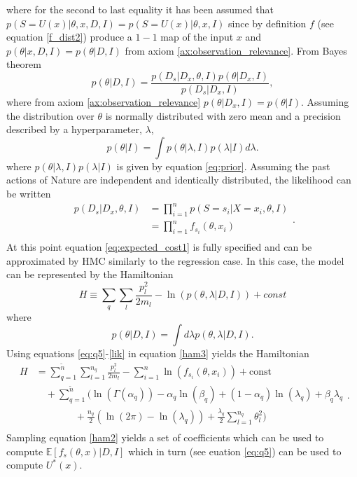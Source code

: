 	where for the second to last equality it has been assumed that $p(S = U(x)|\theta,x,D,I) = p(S = U(x)|\theta,x,I)$ since by definition $f$ (see equation \eqref{f_dist2}) produce a $1-1$ map of the input $x$ and $p(\theta|x,D,I) = p(\theta|D,I)$ from axiom \ref{ax:observation_relevance}. From Bayes theorem
	\begin{equation}
		p(\theta|D,I) =\frac{p(D_s|D_x,\theta,I)p(\theta|D_x,I)}{p(D_s|D_x,I)},
	\end{equation}
	where from axiom \ref{ax:observation_relevance} $p(\theta|D_x,I) = p(\theta|I)$. Assuming the distribution over $\theta$ is normally distributed with zero mean and a precision described by a hyperparameter, $\lambda$, 
	\begin{equation}
		p(\theta|I) = \int p(\theta|\lambda,I)p(\lambda|I)d\lambda.
	\end{equation}
	where $p(\theta|\lambda,I)p(\lambda|I)$ is given by equation \eqref{eq:prior}. Assuming the past actions of Nature are independent and identically distributed, the likelihood can be written~\citep{Fischer1999} 
	\begin{equation}
		\begin{split}
			p(D_s|D_x,\theta,I) &=\prod_{i=1}^{n}p(S = s_i|X = x_i,\theta,I)\\
			&=\prod_{i=1}^{n}f_{s_i}(\theta,x_i)\\
		\end{split}.
		\label{lik}
	\end{equation}
	At this point equation \eqref{eq:expected_cost1} is fully specified and can be approximated by HMC similarly to the regression case. In this case, the model can be represented by the Hamiltonian 
	\begin{equation}
		H \equiv  \sum_{q}\sum_{l}\frac{p_{l}^2}{2m_{l}}-\ln(p(\theta,\lambda|D,I))+const
		\label{ham3}
	\end{equation}
	where
	\begin{equation}
		p(\theta|D,I) = \int d\lambda p(\theta,\lambda|D,I).
	\end{equation}
	Using equations \eqref{eq:q5}-\eqref{lik} in equation \eqref{ham3} yields the Hamiltonian
	\begin{equation}
		\begin{split}
			H&=\sum_{q=1}^{\tilde{n}}\sum_{l=1}^{n_q}\frac{p_{l}^2}{2m_{l}}-\sum_{i=1}^{n}\ln(f_{s_i}(\theta,x_i))+\text{const}\\
			&\quad+\sum_{q=1}^{\tilde{n}}\bigg(\ln(\Gamma(\alpha_q))-\alpha_q\ln(\beta_q)+(1-\alpha_q)\ln(\lambda_q)+\beta_q\lambda_q\\
			&\qquad \qquad+\frac{n_q}{2}(\ln(2\pi)-\ln(\lambda_q))+\frac{\lambda_q}{2}\sum_{l=1}^{n_q}\theta_l^2\bigg)\\
		\end{split}.
		\label{ham2}
	\end{equation}
	Sampling equation \eqref{ham2} yields a set of coefficients which can be used to compute $\mathbb{E}[f_s(\theta,x)|D,I]$ which in turn (see euation \eqref{eq:q5}) can be used to compute $U^*(x)$.
	
